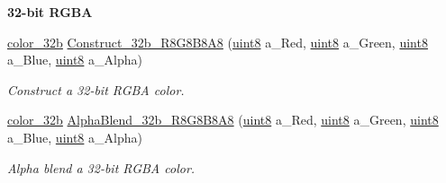 \begin{Indent}{\bf 32-\/bit RGBA}\par
\begin{DoxyCompactItemize}
\item 
\hyperlink{namespacetil_a8eb2d871b8a6ffb55b3eeb720207a6cb}{color\_\-32b} \hyperlink{namespacetil_ae14596c98e011e44e22c8cca0ddccc7e}{Construct\_\-32b\_\-R8G8B8A8} (\hyperlink{namespacetil_a7a75b0e7e2cd3f19ea51c8c02fd242f8}{uint8} a\_\-Red, \hyperlink{namespacetil_a7a75b0e7e2cd3f19ea51c8c02fd242f8}{uint8} a\_\-Green, \hyperlink{namespacetil_a7a75b0e7e2cd3f19ea51c8c02fd242f8}{uint8} a\_\-Blue, \hyperlink{namespacetil_a7a75b0e7e2cd3f19ea51c8c02fd242f8}{uint8} a\_\-Alpha)
\begin{DoxyCompactList}\small\item\em Construct a 32-\/bit RGBA color. \item\end{DoxyCompactList}\item 
\hyperlink{namespacetil_a8eb2d871b8a6ffb55b3eeb720207a6cb}{color\_\-32b} \hyperlink{namespacetil_af5177e6fa03dee2ef309469f0b72c7a8}{AlphaBlend\_\-32b\_\-R8G8B8A8} (\hyperlink{namespacetil_a7a75b0e7e2cd3f19ea51c8c02fd242f8}{uint8} a\_\-Red, \hyperlink{namespacetil_a7a75b0e7e2cd3f19ea51c8c02fd242f8}{uint8} a\_\-Green, \hyperlink{namespacetil_a7a75b0e7e2cd3f19ea51c8c02fd242f8}{uint8} a\_\-Blue, \hyperlink{namespacetil_a7a75b0e7e2cd3f19ea51c8c02fd242f8}{uint8} a\_\-Alpha)
\begin{DoxyCompactList}\small\item\em Alpha blend a 32-\/bit RGBA color. \item\end{DoxyCompactList}\end{DoxyCompactItemize}
\end{Indent}
